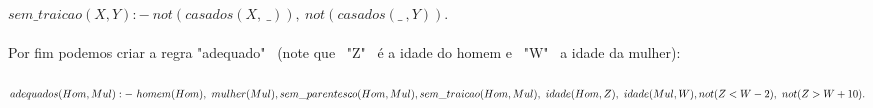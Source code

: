 \documentclass[12pt]{article}
\begin{document}
\begin{itemize}
\begin{itemize}
				$sem\_traicao(X, Y) :- \ not(casados(X, \  \_)), \ not(casados(\_ \ , Y)).$\\ \\
				Por fim podemos criar a regra "adequado" \ (note que \ "Z" \ é a idade do homem e
				\ "W" \ a idade da mulher):\\ \\
				$adequados(Hom, Mul) :- \ homem(Hom),  \ mulher(Mul), \\
				sem\_parentesco(Hom, Mul), \\
				sem\_traicao(Hom, Mul), \ idade(Hom, Z), \ idade(Mul, W), \\
				not(Z < W-2), \ not(Z > W+10).$
			\end{itemize}
	\end{itemize}
\end{document}
